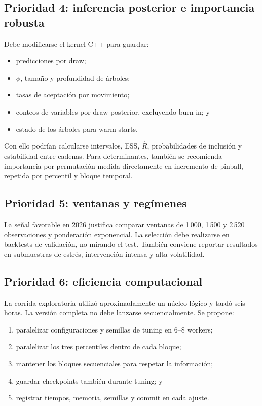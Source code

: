 \documentclass[11pt,a4paper]{article}
\begin{document}
\subsection{Prioridad 4: inferencia posterior e importancia robusta}

Debe modificarse el kernel C++ para guardar:

\begin{itemize}[leftmargin=*]
  \item predicciones por draw;
  \item \(\phi\), tamaño y profundidad de árboles;
  \item tasas de aceptación por movimiento;
  \item conteos de variables por draw posterior, excluyendo burn-in; y
  \item estado de los árboles para warm starts.
\end{itemize}

Con ello podrían calcularse intervalos, ESS, \(\widehat R\), probabilidades
de inclusión y estabilidad entre cadenas. Para determinantes, también se
recomienda importancia por permutación medida directamente en incremento de
pinball, repetida por percentil y bloque temporal.

\subsection{Prioridad 5: ventanas y regímenes}

La señal favorable en 2026 justifica comparar ventanas de 1\,000, 1\,500 y
2\,520 observaciones y ponderación exponencial. La selección debe realizarse
en backtests de validación, no mirando el test. También conviene reportar
resultados en submuestras de estrés, intervención intensa y alta volatilidad.

\subsection{Prioridad 6: eficiencia computacional}

La corrida exploratoria utilizó aproximadamente un núcleo lógico y tardó
seis horas. La versión completa no debe lanzarse secuencialmente. Se propone:

\begin{enumerate}[leftmargin=*]
  \item paralelizar configuraciones y semillas de tuning en 6--8 workers;
  \item paralelizar los tres percentiles dentro de cada bloque;
  \item mantener los bloques secuenciales para respetar la información;
  \item guardar checkpoints también durante tuning; y
  \item registrar tiempos, memoria, semillas y commit en cada ajuste.
\end{enumerate}
\end{document}
